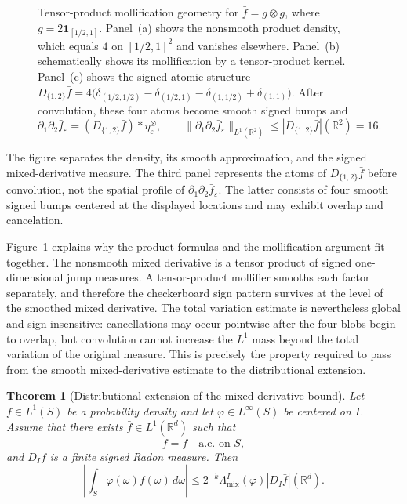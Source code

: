 \documentclass[11pt,letterpaper]{article}
\newtheorem{theorem}{Theorem}[section]
\theoremstyle{definition}
\theoremstyle{remark}
\begin{document}
\begin{figure}[H]
\caption{
Tensor-product mollification geometry for
$\bar f=g\otimes g$, where
$g=2\mathbf 1_{[1/2,1]}$.
Panel~\textup{(a)} shows the nonsmooth product density, which equals $4$ on
$[1/2,1]^2$ and vanishes elsewhere. Panel~\textup{(b)} schematically shows its
mollification by a tensor-product kernel. Panel~\textup{(c)} shows the signed
atomic structure
$\displaystyle
D_{\{1,2\}}\bar f
=
4\bigl(
\delta_{(1/2,1/2)}
-\delta_{(1/2,1)}
-\delta_{(1,1/2)}
+\delta_{(1,1)}
\bigr).
$
After convolution, these four atoms become smooth signed bumps and
$\displaystyle
\partial_1\partial_2\bar f_\varepsilon
=
(D_{\{1,2\}}\bar f)*\eta_\varepsilon^\otimes,
\qquad
\|\partial_1\partial_2\bar f_\varepsilon\|_{L^1(\mathbb R^2)}
\le
|D_{\{1,2\}}\bar f|(\mathbb R^2)
=
16.
$
}
\label{fig:appendix_tensor_mollification_geometry}
\end{figure}

The figure separates the density, its smooth approximation, and the signed
mixed-derivative measure. The third panel represents the atoms of
$D_{\{1,2\}}\bar f$ before convolution, not the spatial profile of
$\partial_1\partial_2\bar f_\varepsilon$. The latter consists of four smooth
signed bumps centered at the displayed locations and may exhibit overlap and
cancelation.


Figure~\ref{fig:appendix_tensor_mollification_geometry} explains why the
product formulas and the mollification argument fit together. The nonsmooth
mixed derivative is a tensor product of signed one-dimensional jump measures.
A tensor-product mollifier smooths each factor separately, and therefore the
checkerboard sign pattern survives at the level of the smoothed mixed
derivative. The total variation estimate is nevertheless global and
sign-insensitive: cancellations may occur pointwise after the four blobs begin
to overlap, but convolution cannot increase the $L^1$ mass beyond the total
variation of the original measure. This is precisely the property required to
pass from the smooth mixed-derivative estimate to the distributional extension.

\begin{theorem}[Distributional extension of the mixed-derivative bound]
\label{thm:appendix_distributional_extension_bound}
Let $f\in L^1(S)$ be a probability density and let
$\varphi\in L^\infty(S)$ be centered on $I$. Assume that there exists
$\bar f\in L^1(\mathbb R^d)$ such that
$$
\bar f=f\quad\text{a.e. on }S,
$$
and $D_I\bar f$ is a finite signed Radon measure. Then
\begin{equation}
\label{eq:appendix_distributional_extension_bound}
\left|\int_S\varphi(\omega)f(\omega)\,d\omega\right|
\le
2^{-k}\Lambda_{\mathrm{mix}}^I(\varphi)
|D_I\bar f|(\mathbb R^d).
\end{equation}
\end{theorem}
\end{document}
